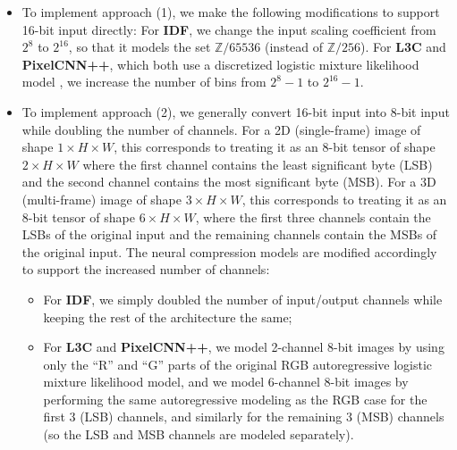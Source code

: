 \begin{itemize}
    \item To implement approach (1), we make the following modifications to support 16-bit input directly:
    For \textbf{IDF}, we change the input scaling coefficient from $2^8$ to $2^{16}$, so that it models the set $\mathbb{Z}/65536$ (instead of $\mathbb{Z}/256$). For \textbf{L3C} and \textbf{PixelCNN++}, which both use a discretized logistic mixture likelihood model \citep{pixelcn}, we increase the number of bins from $2^8 -1$ to $2^{16}-1$. 

    \item To implement approach (2), we 
generally convert 16-bit input into 8-bit input while doubling the number of channels. For a 2D (single-frame) image of shape $1 \times H \times W$, this corresponds to treating it as an 8-bit tensor of shape $2 \times H \times W$ where the first channel contains the least significant byte (LSB) and the second channel contains the most significant byte (MSB).
For a 3D (multi-frame) image of shape $3 \times H \times W$, this corresponds to treating it as an 8-bit tensor of shape $6 \times H \times W$, where the first three channels contain the LSBs of the original input and the remaining channels contain the MSBs of the original input.
The neural compression models are modified accordingly to support the increased number of channels: 
\begin{itemize}
    \item For \textbf{IDF}, we simply doubled the number of input/output channels while keeping the rest of the architecture the same; 
    \item For \textbf{L3C} and \textbf{PixelCNN++}, we model 2-channel 8-bit images by using only the ``R'' and ``G'' parts of the original RGB autoregressive logistic mixture likelihood model, and we model 6-channel 8-bit images by performing the same autoregressive modeling as the RGB case for the first 3 (LSB) channels, and similarly for the remaining 3 (MSB) channels (so the LSB and MSB channels are modeled separately). 
\end{itemize}

\end{itemize}


